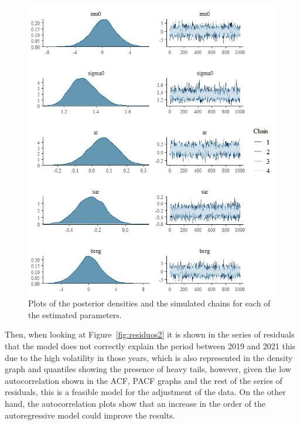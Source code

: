 %
\begin{figure}[ht] \centering
	\includegraphics[width = 0.9\columnwidth]{Figs/c.png}
	\caption{Plots of the posterior densities and the simulated chains for each of the estimated parameters.}\label{fig:cadenas2}
\end{figure}
%
Then, when looking at Figure~\ref{fig:residuos2} it is shown in the series of residuals that the model does not correctly explain the period between 2019 and 2021 this due to the high volatility in those years, which is also represented in the density graph and quantiles showing the presence of heavy tails, however, given the low autocorrelation shown in the ACF, PACF graphs and the rest of the series of residuals, this is a feasible model for the adjustment of the data. On the other hand, the autocorrelation plots show that an increase in the order of the autoregressive model could improve the results.

